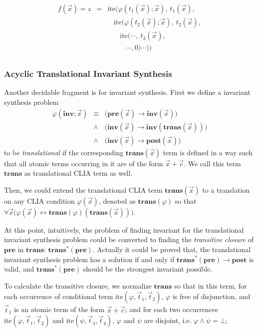 \documentclass[conference]{IEEEtran}
\newcommand{\vecx}{\vec{x}}
\newcommand{\vect}{\vec{t}}
\newcommand{\vecc}{\vec{c}}
\newcommand{\ite}{\mathrm{ite}}
\newcommand{\inv}{\mathrm{\mathbf{inv}}}
\newcommand{\pre}{\mathrm{\mathbf{pre}}}
\newcommand{\post}{\mathrm{\mathbf{post}}}
\newcommand{\trans}{\mathrm{\mathbf{trans}}}
\begin{document}
\begin{displaymath}
\begin{array}{lll}
f(\vecx) = z & = & \ite \Big( \varphi(t_1(\vecx); \vecx),~ t_1(\vecx),  \\
& & ~~~~ \ite \Big( \varphi(t_2(\vecx); \vecx),~ t_2(\vecx), \\
& & ~~~~~~~~ \ite \Big( \cdots ,~ t_3(\vecx), \\
& & ~~~~~~~~~~~~ \cdots, 0 \Big) \cdots \Big) \Big) \\
\end{array}
\end{displaymath}

\subsubsection*{Acyclic Translational Invariant Synthesis}

Another decidable fragment is for invariant synthesis. First we define a invariant synthesis problem
\begin{displaymath}
\begin{array}{lll}
\varphi(\inv; \vecx) & \equiv & \Big( \pre(\vecx) \rightarrow \inv(\vecx) \Big) \\
& \wedge & \Big( \inv(\vecx) \rightarrow \inv(\trans(\vecx)) \Big) \\
& \wedge & \Big( \inv(\vecx) \rightarrow \post(\vecx) \Big)
\end{array}
\end{displaymath}
to be \emph{translational} if the corresponding $\trans(\vecx)$ term is defined in a way such that all atomic terms occurring in it are of the form $\vecx + \vecc$. We call this term $\trans$ as translational CLIA term as well.

Then, we could extend the translational CLIA term $\trans(\vecx)$ to a translation on any CLIA condition $\varphi(\vecx)$, denoted as $\trans(\varphi)$ so that $\forall\vecx\Big(\varphi(\vecx) \leftrightarrow \trans(\varphi)(\trans(\vecx))\Big)$.

At this point, intuitively, the problem of finding invariant for the translational invariant synthesis problem could be converted to finding the \emph{transitive closure} of $\pre$ in $\trans$: $\trans^*(\pre)$. Actually it could be proved that, the translational invariant synthesis problem has a solution if and only if $\trans^*(\pre) \rightarrow \post$ is valid, and $\trans^*(\pre)$ should be the strongest invariant possible.

To calculate the transitive closure, we normalize $\trans$ so that in this term, for each occurrence of conditional term $\ite(\varphi, \vect_1, \vect_2)$, $\varphi$ is free of disjunction, and $\vect_1$ is an atomic term of the form $\vecx + \vecc$; and for each two occurrences $\ite(\varphi, \vect_1, \vect_2)$ and $\ite(\psi, \vect_3, \vect_4)$, $\varphi$ and $\psi$ are disjoint, i.e. $\varphi \land \psi = \bot$;
\end{document}
